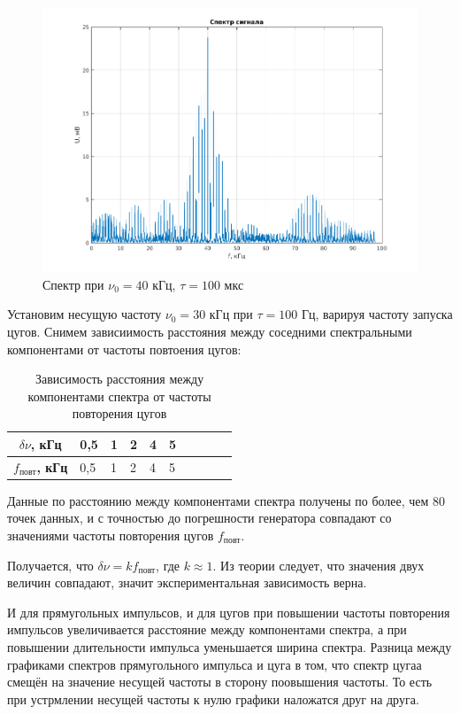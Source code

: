 \documentclass[a4paper, 12pt]{article}%
\begin{document}
\begin{figure}[h!]
    \centering
    \includegraphics[width = 14 cm]{images/2_40k.png}
    \caption{Спектр при $\nu_0 = 40$ кГц, $\tau = 100$ мкс}
\end{figure}

Установим несущую частоту $\nu_0 = 30$ кГц при $\tau = 100$ Гц, варируя частоту запуска цугов. Снимем зависиимость расстояния между соседними спектральными компонентами от частоты повтоения цугов:

\begin{table}[]
    \centering
    \begin{tabular}{|c|l|l|l|l|l|l|l|l|l|}
        \hline
        \textbf{$\delta \nu$, кГц}      & 0,5 & 1  & 2 & 4  & 5  \\ \hline
        \textbf{$f_{\text{повт}}$, кГц} & 0,5 & 1  & 2 & 4  & 5  \\ \hline
    \end{tabular}
    \caption{Зависимость расстояния между компонентами спектра от частоты повторения цугов}
\end{table}

Данные по расстоянию между компонентами спектра получены по более, чем 80 точек данных, и с точностью до погрешности генератора совпадают со значениями частоты повторения цугов $f_{\text{повт}}$.

Получается, что $\delta \nu = k f_{\text{повт}}$, где $k \approx 1$. Из теории следует, что значения двух величин совпадают, значит экспериментальная зависимость верна.

И для прямугольных импульсов, и для цугов при повышении частоты повторения импульсов увеличивается расстояние между компонентами спектра, а при повышении длительности импульса уменьшается ширина спектра. Разница между графиками спектров прямугольного импульса и цуга в том, что спектр цугаа смещён на значение несущей частоты в сторону поовышения частоты. То есть при устрмлении несущей частоты к нулю графики наложатся друг на друга.
\end{document}
